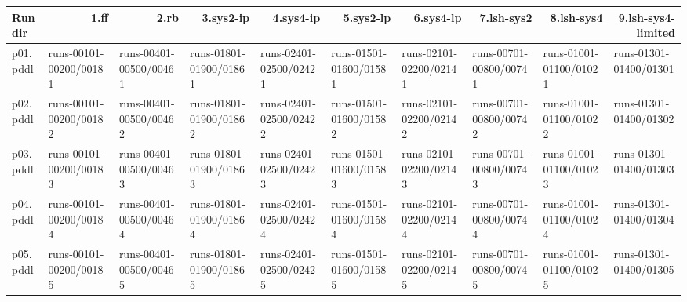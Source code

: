 \documentclass{article}
\begin{document}
\begin{tabular}{@{}lrrrrrrrrr@{}}
Run dir & 1.ff & 2.rb & 3.sys2-ip & 4.sys4-ip & 5.sys2-lp & 6.sys4-lp & 7.lsh-sys2 & 8.lsh-sys4 & 9.lsh-sys4-limited \\
\midrule
p01.pddl & \multicolumn{1}{|l|}{runs-00101-00200/00181} & \multicolumn{1}{|l|}{runs-00401-00500/00461} & \multicolumn{1}{|l|}{runs-01801-01900/01861} & \multicolumn{1}{|l|}{runs-02401-02500/02421} & \multicolumn{1}{|l|}{runs-01501-01600/01581} & \multicolumn{1}{|l|}{runs-02101-02200/02141} & \multicolumn{1}{|l|}{runs-00701-00800/00741} & \multicolumn{1}{|l|}{runs-01001-01100/01021} & \multicolumn{1}{|l|}{runs-01301-01400/01301} \\
p02.pddl & \multicolumn{1}{|l|}{runs-00101-00200/00182} & \multicolumn{1}{|l|}{runs-00401-00500/00462} & \multicolumn{1}{|l|}{runs-01801-01900/01862} & \multicolumn{1}{|l|}{runs-02401-02500/02422} & \multicolumn{1}{|l|}{runs-01501-01600/01582} & \multicolumn{1}{|l|}{runs-02101-02200/02142} & \multicolumn{1}{|l|}{runs-00701-00800/00742} & \multicolumn{1}{|l|}{runs-01001-01100/01022} & \multicolumn{1}{|l|}{runs-01301-01400/01302} \\
p03.pddl & \multicolumn{1}{|l|}{runs-00101-00200/00183} & \multicolumn{1}{|l|}{runs-00401-00500/00463} & \multicolumn{1}{|l|}{runs-01801-01900/01863} & \multicolumn{1}{|l|}{runs-02401-02500/02423} & \multicolumn{1}{|l|}{runs-01501-01600/01583} & \multicolumn{1}{|l|}{runs-02101-02200/02143} & \multicolumn{1}{|l|}{runs-00701-00800/00743} & \multicolumn{1}{|l|}{runs-01001-01100/01023} & \multicolumn{1}{|l|}{runs-01301-01400/01303} \\
p04.pddl & \multicolumn{1}{|l|}{runs-00101-00200/00184} & \multicolumn{1}{|l|}{runs-00401-00500/00464} & \multicolumn{1}{|l|}{runs-01801-01900/01864} & \multicolumn{1}{|l|}{runs-02401-02500/02424} & \multicolumn{1}{|l|}{runs-01501-01600/01584} & \multicolumn{1}{|l|}{runs-02101-02200/02144} & \multicolumn{1}{|l|}{runs-00701-00800/00744} & \multicolumn{1}{|l|}{runs-01001-01100/01024} & \multicolumn{1}{|l|}{runs-01301-01400/01304} \\
p05.pddl & \multicolumn{1}{|l|}{runs-00101-00200/00185} & \multicolumn{1}{|l|}{runs-00401-00500/00465} & \multicolumn{1}{|l|}{runs-01801-01900/01865} & \multicolumn{1}{|l|}{runs-02401-02500/02425} & \multicolumn{1}{|l|}{runs-01501-01600/01585} & \multicolumn{1}{|l|}{runs-02101-02200/02145} & \multicolumn{1}{|l|}{runs-00701-00800/00745} & \multicolumn{1}{|l|}{runs-01001-01100/01025} & \multicolumn{1}{|l|}{runs-01301-01400/01305} \\

\end{tabular}
\end{document}
